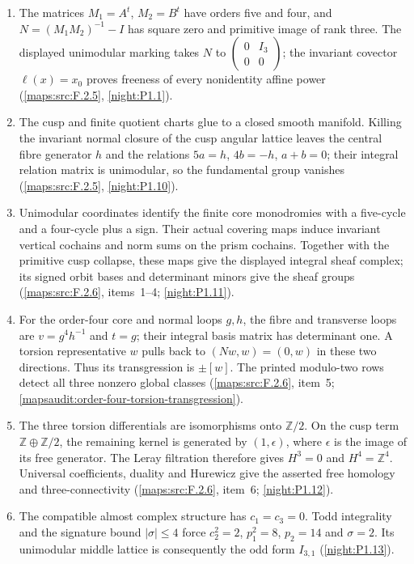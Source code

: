 \begin{enumerate}[label=\arabic*.]
\item The matrices $M_1=A^t$, $M_2=B^t$ have orders five and four, and
  $N=(M_1M_2)^{-1}-I$ has square zero and primitive image of rank three.
  The displayed unimodular marking takes $N$ to
  $\left(\begin{smallmatrix}0&I_3\\0&0\end{smallmatrix}\right)$;
  the invariant covector $\ell(x)=x_0$ proves freeness of every
  nonidentity affine power
  (\cref{maps:src:F.2.5}, \cref{night:P1.1}).
\item The cusp and finite quotient charts glue to a closed smooth
  manifold.  Killing the invariant normal closure of the cusp angular lattice
  leaves the central fibre generator $h$ and the relations $5a=h$, $4b=-h$, $a+b=0$;
  their integral relation matrix is unimodular, so the fundamental
  group vanishes (\cref{maps:src:F.2.5}, \cref{night:P1.10}).
\item Unimodular coordinates identify the finite core monodromies
  with a five-cycle and a four-cycle plus a sign.  Their actual
  covering maps induce invariant vertical cochains and norm sums
  on the prism cochains.  Together with the primitive cusp collapse,
  these maps give the displayed integral sheaf complex; its signed
  orbit bases and determinant minors give the sheaf groups
  (\cref{maps:src:F.2.6}, items~1--4; \cref{night:P1.11}).
\item For the order-four core and normal loops $g,h$, the fibre and
  transverse loops are $v=g^4h^{-1}$ and $t=g$; their integral
  basis matrix has determinant one.  A torsion representative $w$
  pulls back to $(Nw,w)=(0,w)$ in these two directions.
  Thus its transgression is $\pm[w]$.  The printed modulo-two
  rows detect all three nonzero global classes
  (\cref{maps:src:F.2.6}, item~5;
  \cref{mapsaudit:order-four-torsion-transgression}).
\item The three torsion differentials are isomorphisms onto
  $\mathbb Z/2$.  On the cusp term $\mathbb Z\oplus\mathbb Z/2$,
  the remaining kernel is generated by $(1,\epsilon)$, where
  $\epsilon$ is the image of its free generator.
  The Leray filtration therefore gives $H^3=0$ and
  $H^4=\mathbb Z^4$.  Universal coefficients, duality and
  Hurewicz give the asserted free homology and three-connectivity
  (\cref{maps:src:F.2.6}, item~6; \cref{night:P1.12}).
\item The compatible almost complex structure has $c_1=c_3=0$.
  Todd integrality and the signature bound $|\sigma|\leq4$ force
  $c_2^2=2$, $p_1^2=8$, $p_2=14$ and $\sigma=2$.
  Its unimodular middle lattice is consequently the odd form
  $I_{3,1}$ (\cref{night:P1.13}).
\end{enumerate}

